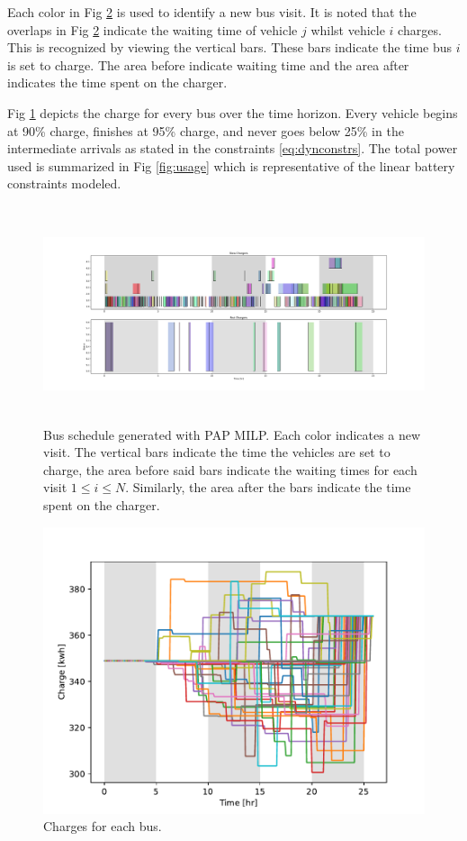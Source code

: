 \documentclass[letterpaper, 10pt, conference]{IEEEtran}
\begin{document}
Each color in Fig \ref{fig:schedule} is used to identify a new bus visit. It is noted that the overlaps in Fig \ref{fig:schedule} indicate the waiting time of vehicle \(j\) whilst vehicle \(i\) charges. This is recognized by viewing the vertical bars. These bars indicate the time bus \(i\) is set to charge. The area before indicate waiting time and the area after indicates the time spent on the charger.

Fig \ref{fig:charges} depicts the charge for every bus over the time horizon. Every vehicle begins at 90\% charge, finishes at 95\% charge, and never goes below 25\% in the intermediate arrivals as stated in the constraints \eqref{eq:dynconstrs}. The total power used is summarized in Fig \ref{fig:usage} which is representative of the linear battery constraints modeled.

\begin{figure}[ht]
	\centering
	\includegraphics[trim=3in 0in 3in 0in, width=\linewidth, height=2.5in]{schedule.pdf}
	\caption{Bus schedule generated with PAP MILP. Each color indicates a new visit. The vertical bars indicate the time the vehicles are set to charge, the area before said bars indicate the waiting times for each visit \(1 \leq i \leq N\). Similarly, the area after the bars indicate the time spent on the charger.}
	\label{fig:charges}
\end{figure}

\begin{figure}[ht]
	\centering
	\includegraphics[trim=0in 0in 0in 0.75in, width=0.75\linewidth]{charges.pdf}
	\caption{Charges for each bus.}
	\label{fig:schedule}
\end{figure}
\end{document}
